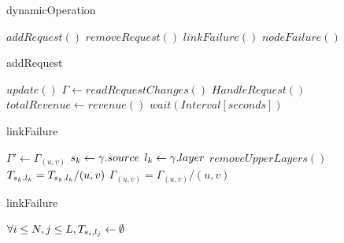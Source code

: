 \documentclass[a4paper, 10pt, conference]{ieeeconf}
\begin{document}
\begin{algorithm}
    \caption{dynamicOperation}\label{alg:dynamicOperation}
    \begin{algorithmic}[1]
                \State $addRequest()$
            \EndCase
                \State $removeRequest()$
            \EndCase
                \State $linkFailure()$
            \EndCase
                \State $nodeFailure()$
            \EndCase
        \EndSwitch
    \EndProcedure
    \end{algorithmic}
\end{algorithm}
\begin{algorithm}
    \caption{addRequest}\label{alg:addRequest}
    \begin{algorithmic}[1]
                \State $update()$
            \EndIf
            \State $\Gamma \gets readRequestChanges()$
            \State $HandleRequest()$
            \State $totalRevenue \gets revenue()$
            \State $wait(Interval [seconds])$
        \EndWhile
    \EndProcedure
\end{algorithmic}
\end{algorithm}
\begin{algorithm}
    \caption{linkFailure}\label{alg:linkFailure}
    \begin{algorithmic}[1]
            \State $\Gamma' \gets \Gamma_{(u,v)}$
                \State $s_k\gets\gamma.source$ 
                \State $l_k\gets\gamma.layer$
                \State $removeUpperLayers()$
                \State $T_{s_k,l_k} = T_{s_k,l_k} / (u,v)$
                \State $\Gamma_{(u,v)} = \Gamma_{(u,v)} / (u,v)$
            \EndFor
        \EndIf
    \EndProcedure
    \end{algorithmic}
\end{algorithm}
\begin{algorithm}
    \caption{linkFailure}\label{alg:nodeFailure}
    \begin{algorithmic}[1]
        \State $\forall i \le N, j \le L, T_{s_i,l_j} \gets \emptyset$
    \EndProcedure
    \end{algorithmic}
\end{algorithm}
\end{document}
